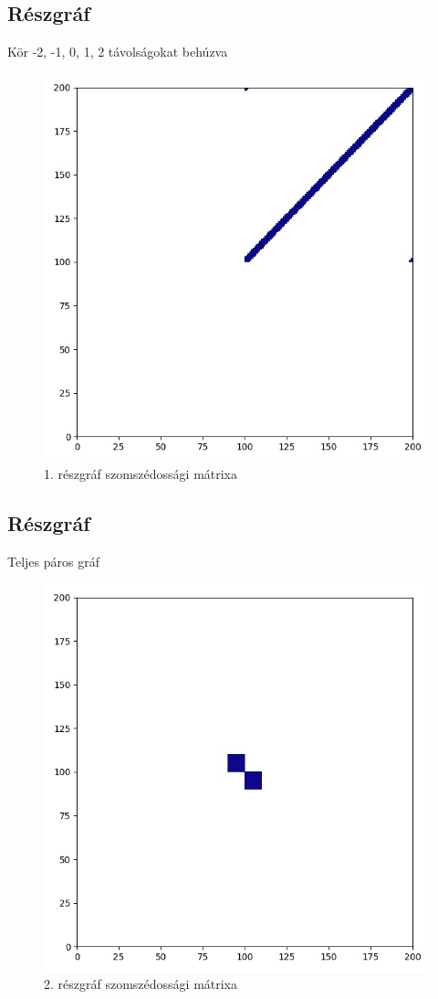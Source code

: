 \documentclass[14pt,a4paper]{article}
\begin{document}
\subsection{Részgráf}
Kör -2, -1, 0, 1, 2 távolságokat behúzva
\begin{figure}[H]
\centering
\includegraphics[width = 0.7\columnwidth]{subgraph_01.jpg}
\caption{1. részgráf szomszédossági mátrixa}
\end{figure}
\subsection{Részgráf}
Teljes páros gráf
\begin{figure}[H]
\centering
\includegraphics[width = 0.7\columnwidth]{subgraph_02.jpg}
\caption{2. részgráf szomszédossági mátrixa}
\end{figure}
\end{document}
